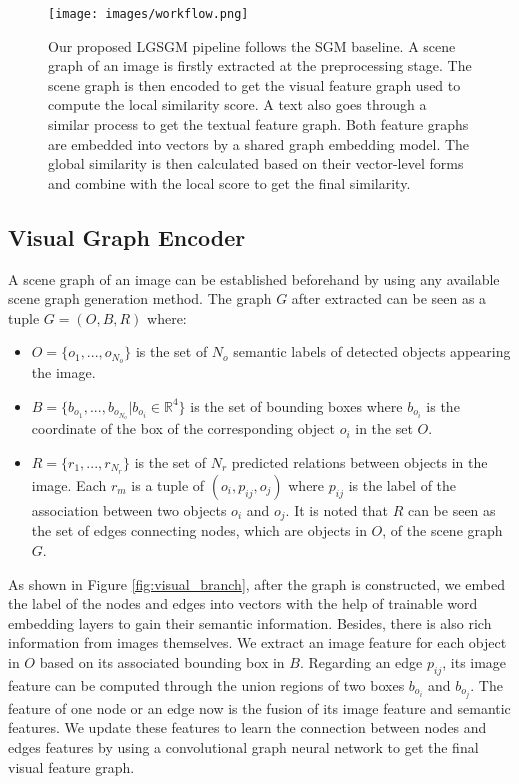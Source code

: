 \documentclass{IOS-Book-Article}
\begin{document}
\begin{figure*}[ht!]
  \centering
  \texttt{[image: images/workflow.png]}
  \caption{Our proposed LGSGM pipeline follows the SGM baseline. A scene graph of an image is firstly extracted at the preprocessing stage. The scene graph is then encoded to get the visual feature graph used to compute the local similarity score. A text also goes through a similar process to get the textual feature graph. Both feature graphs are embedded into vectors by a shared graph embedding model. The global similarity is then calculated based on their vector-level forms and combine with the local score to get the final similarity.}
  \label{fig:workflow}
\end{figure*}

\subsection{Visual Graph Encoder}
A scene graph of an image can be established beforehand by using any available scene graph generation method. 
The graph $G$ after extracted can be seen as a tuple $G = (O, B, R)$ where: 
\begin{itemize}
    \item $O = \{o_1, ..., o_{N_o}\}$ is the set of $N_o$ semantic labels of detected objects appearing the image.
    \item $B = \{b_{o_1}, ..., b_{o_{N_o}} | b_{o_i} \in \mathbb{R}^4\}$ is the set of bounding boxes where $b_{o_i}$ is the coordinate of the box of the corresponding object $o_i$ in the set $O$.
    \item $R = \{r_1, ..., r_{N_r}\}$ is the set of $N_r$ predicted relations between objects in the image. Each $r_m$ is a tuple of $(o_i, p_{ij}, o_j)$ where $p_{ij}$ is the label of the association between two objects $o_i$ and $o_j$. It is noted that $R$ can be seen as the set of edges connecting nodes, which are objects in $O$, of the scene graph $G$.
\end{itemize}
As shown in Figure \ref{fig:visual_branch}, after the graph is constructed, we embed the label of the nodes and edges into vectors with the help of trainable word embedding layers to gain their semantic information. Besides, there is also rich information from images themselves. We extract an image feature for each object in $O$ based on its associated bounding box in $B$. Regarding an edge $p_{ij}$, its image feature can be computed through the union regions of two boxes $b_{o_i}$ and $b_{o_j}$. The feature of one node or an edge now is the fusion of its image feature and semantic features. We update these features to learn the connection between nodes and edges features by using a convolutional graph neural network \cite{wu2020comprehensive} to get the final visual feature graph.
\end{document}
